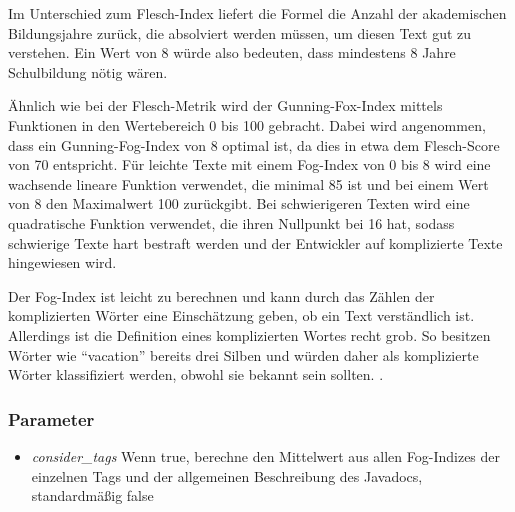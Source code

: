 Im Unterschied zum Flesch-Index liefert die Formel die Anzahl der akademischen Bildungsjahre zurück, die absolviert werden müssen, um diesen Text gut zu verstehen. Ein Wert von 8 würde also bedeuten, dass mindestens 8 Jahre Schulbildung nötig wären\cite[S. 24]{ThePrinciplesofReadability}. 

Ähnlich wie bei der Flesch-Metrik wird der Gunning-Fox-Index mittels Funktionen in den Wertebereich 0 bis 100 gebracht. Dabei wird angenommen, dass ein Gunning-Fog-Index von 8 optimal ist, da dies in etwa dem Flesch-Score von 70 entspricht. Für leichte Texte mit einem Fog-Index von 0 bis 8 wird eine wachsende lineare Funktion verwendet, die minimal 85 ist und bei einem Wert von 8 den Maximalwert 100 zurückgibt. Bei schwierigeren Texten  wird eine quadratische Funktion verwendet, die ihren Nullpunkt bei 16 hat, sodass schwierige Texte hart bestraft werden und der Entwickler auf komplizierte Texte hingewiesen wird.

Der Fog-Index ist leicht zu berechnen und kann durch das Zählen der komplizierten Wörter eine Einschätzung geben, ob ein Text verständlich ist. Allerdings ist die Definition eines komplizierten Wortes recht grob. So besitzen Wörter wie \enquote{vacation} bereits drei Silben und würden daher als komplizierte Wörter klassifiziert werden, obwohl sie  bekannt sein sollten. \cite[S. 10]{bogert1985defense}.

\subsubsection{Parameter}
\begin{itemize}
    \item \textit{consider\_tags} Wenn true, berechne den Mittelwert aus allen Fog-Indizes der einzelnen Tags und der allgemeinen Beschreibung des Javadocs, standardmäßig false
\end{itemize}
